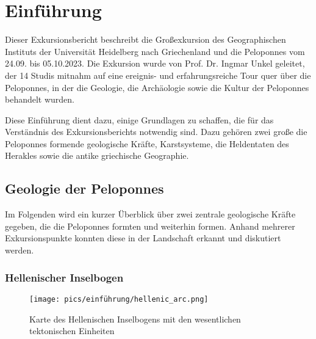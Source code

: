 \documentclass[preprint]{geomorphica} %
\makeatletter
\newcommand\tabularnums{
  \def\sourcesanspro@figurealign{T}
  \def\sourcesanspro@figurestyle{LF}
  \def\familydefault{SourceSansPro-TLF}
  \fontfamily{SourceSansPro-TLF}
  \selectfont
}
\makeatother
\begin{document}
\renewcommand{\contentsname}{Inhaltsverzeichnis}
{\tabularnums
 \tableofcontents
}
\newpage



\section*{Einführung}

Dieser Exkursionsbericht beschreibt die Großexkursion des Geographischen Instituts der Universität Heidelberg nach Griechenland und die Peloponnes vom 24.09. bis 05.10.2023. Die Exkursion wurde von Prof. Dr. Ingmar Unkel geleitet, der 14 Studis mitnahm auf eine ereignis- und erfahrungsreiche Tour quer über die Peloponnes, in der die Geologie, die Archäologie sowie die Kultur der Peloponnes behandelt wurden.

Diese Einführung dient dazu, einige Grundlagen zu schaffen, die für das Verständnis des Exkursionsberichts notwendig sind. Dazu gehören zwei große die Peloponnes formende geologische Kräfte, Karstsysteme, die Heldentaten des Herakles sowie die antike griechische Geographie.

\subsection*{Geologie der Peloponnes}

Im Folgenden wird ein kurzer Überblick über zwei zentrale geologische Kräfte gegeben, die die Peloponnes formten und weiterhin formen. Anhand mehrerer Exkursionspunkte konnten diese in der Landschaft erkannt und diskutiert werden.

\subsubsection*{Hellenischer Inselbogen}
\label{sec:hellarc}

\begin{wrapfigure}{r}{0.5\textwidth}
    \vspace{-5mm}
    \centering
    \texttt{[image: pics/einführung/hellenic\_arc.png]}
    \caption{Karte des Hellenischen Inselbogens mit den wesentlichen tektonischen Einheiten \cite{Karkani.Evelpidou.ea2022}}
    \label{pic:hellarc}
\end{wrapfigure}
\end{document}
